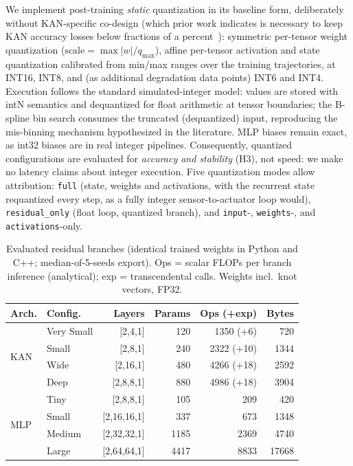 \documentclass[conference]{IEEEtran}
\begin{document}
We implement post-training \emph{static} quantization in its baseline form,
deliberately without KAN-specific co-design (which prior work indicates is
necessary to keep KAN accuracy losses below fractions of a
percent~\cite{huang2025hardware}): symmetric per-tensor weight quantization
($\mathrm{scale}=\max|w|/q_{\max}$), affine per-tensor activation and state
quantization calibrated from min/max ranges over the training trajectories,
at INT16, INT8, and (as additional degradation data points) INT6 and INT4.
Execution follows the standard simulated-integer model: values are stored
with intN semantics and dequantized for float arithmetic at tensor
boundaries; the B-spline bin search consumes the truncated (dequantized)
input, reproducing the mis-binning mechanism hypothesized in the literature.
MLP biases remain exact, as int32 biases are in real integer pipelines.
Consequently, quantized configurations are evaluated for \emph{accuracy and
stability} (H3), not speed: we make no latency claims about integer execution.
Five quantization modes allow attribution: \texttt{full} (state, weights and
activations, with the recurrent state requantized every step, as a fully
integer sensor-to-actuator loop would), \texttt{residual\_only} (float loop,
quantized branch), and \texttt{input}-, \texttt{weights}-, and
\texttt{activations}-only.

\begin{table}[t]
\centering
\caption{Evaluated residual branches (identical trained weights in Python and
C++; median-of-5-seeds export). Ops = scalar FLOPs per branch inference
(analytical); exp = transcendental calls. Weights incl.\ knot vectors, FP32.}
\label{tab:models}
\small
\setlength{\tabcolsep}{4.5pt}
\begin{tabular}{llrrrr}
\toprule
Arch. & Config. & Layers & Params & Ops (+exp) & Bytes \\
\midrule
\multirow{4}{*}{KAN}
 & Very Small & [2,4,1]   & 120  & 1350 (+6)  & 720 \\
 & Small      & [2,8,1]   & 240  & 2322 (+10) & 1344 \\
 & Wide       & [2,16,1]  & 480  & 4266 (+18) & 2592 \\
 & Deep       & [2,8,8,1] & 880  & 4986 (+18) & 3904 \\
\midrule
\multirow{4}{*}{MLP}
 & Tiny   & [2,8,8,1]    & 105  & 209  & 420 \\
 & Small  & [2,16,16,1]  & 337  & 673  & 1348 \\
 & Medium & [2,32,32,1]  & 1185 & 2369 & 4740 \\
 & Large  & [2,64,64,1]  & 4417 & 8833 & 17668 \\
\bottomrule
\end{tabular}
\end{table}
\end{document}
